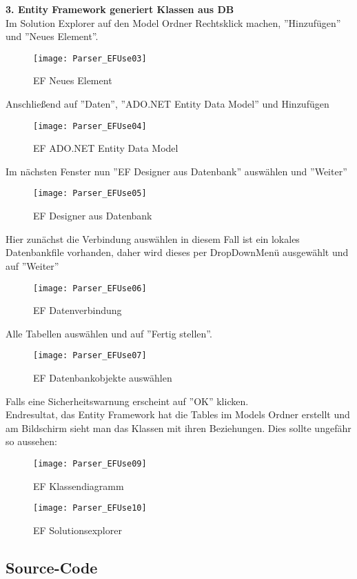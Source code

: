 \textbf{3. Entity Framework generiert Klassen aus DB} \\
Im Solution Explorer auf den Model Ordner Rechtsklick machen, ''Hinzufügen'' und ''Neues Element''.
\begin{figure}[H]
    \centering
    \texttt{[image: Parser\_EFUse03]}
    \caption{EF Neues Element}
    \label{fig:parsef03}
\end{figure} 
Anschließend auf ''Daten'', ''ADO.NET Entity Data Model'' und Hinzufügen
\begin{figure}[H]
    \centering
    \texttt{[image: Parser\_EFUse04]}
    \caption{EF ADO.NET Entity Data Model}
    \label{fig:parsef04}
\end{figure} 
Im nächsten Fenster nun  ''EF Designer aus Datenbank'' auswählen und ''Weiter''
\begin{figure}[H]
    \centering
    \texttt{[image: Parser\_EFUse05]}
    \caption{EF Designer aus Datenbank}
    \label{fig:parsef05}
\end{figure} 
Hier zunächst die Verbindung auswählen in diesem Fall ist ein lokales Datenbankfile vorhanden, daher wird dieses per DropDownMenü ausgewählt und auf ''Weiter''
\begin{figure}[H]
    \centering
    \texttt{[image: Parser\_EFUse06]}
    \caption{EF Datenverbindung}
    \label{fig:parsef06}
\end{figure} 
Alle Tabellen auswählen und auf ''Fertig stellen''. 
\begin{figure}[H]
    \centering
    \texttt{[image: Parser\_EFUse07]}
    \caption{EF Datenbankobjekte auswählen}
    \label{fig:parsef07}
\end{figure} 
Falls eine Sicherheitswarnung erscheint auf ''OK'' klicken. \\
Endresultat, das Entity Framework hat die Tables im Models Ordner erstellt und am Bildschirm sieht man das Klassen mit ihren Beziehungen. Dies sollte ungefähr so aussehen:
\begin{figure}[H]
    \centering
    \texttt{[image: Parser\_EFUse09]}
    \caption{EF Klassendiagramm}
    \label{fig:parsef07}
\end{figure} 
\begin{figure}[H]
    \centering
    \texttt{[image: Parser\_EFUse10]}
    \caption{EF Solutionsexplorer}
    \label{fig:parsef07}
\end{figure} 
\subsection{Source-Code}
\label{ef-sourcecode}

